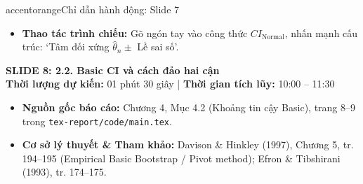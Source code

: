 \documentclass[10pt,a4paper]{article}
\newcommand{\slideheader}[4]{
    \vspace{0.4cm}
    \begin{tcolorbox}[colback=primary!7!white, colframe=primary, arc=2mm, boxrule=1pt, left=4mm, right=4mm, top=2.5mm, bottom=2.5mm]
        {\Large\bfseries\color{primary} SLIDE #1: #2}\\[0.1cm]
        {\small\textbf{Thời lượng dự kiến:} #3 \quad | \quad \textbf{Thời gian tích lũy:} #4}
    \end{tcolorbox}
    \vspace{0.15cm}
}
\begin{document}
\begin{actionbox}{accentorange}{Chỉ dẫn hành động: Slide 7}
    \begin{itemize}
        \item \textbf{Thao tác trình chiếu:} Gõ ngón tay vào công thức $CI_{\text{Normal}}$, nhấn mạnh cấu trúc: `Tâm đối xứng $\hat\theta_n \pm$ Lề sai số'.
    \end{itemize}
\end{actionbox}

\newpage

\slideheader{8}{2.2. Basic CI và cách đảo hai cận}{01 phút 30 giây}{10:00 -- 11:30}

\begin{itemize}
    \item \textbf{Nguồn gốc báo cáo:} Chương 4, Mục 4.2 (Khoảng tin cậy Basic), trang 8--9 trong \texttt{tex-report/code/main.tex}.
    \item \textbf{Cơ sở lý thuyết \& Tham khảo:} Davison \& Hinkley (1997), Chương 5, tr. 194--195 (Empirical Basic Bootstrap / Pivot method); Efron \& Tibshirani (1993), tr. 174--175.
\end{itemize}
\end{document}
